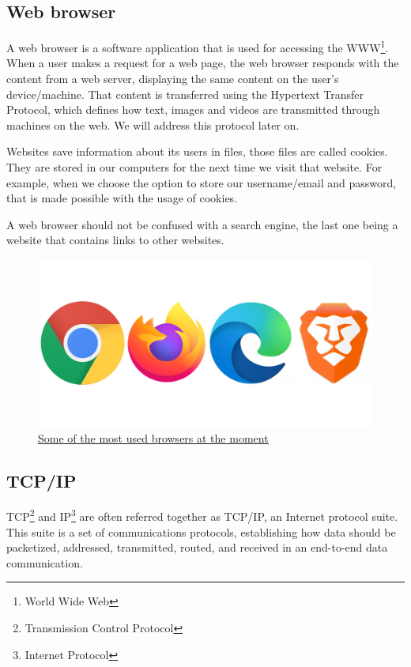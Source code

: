 \documentclass{article}
\newcommand\tab[1][1cm]{\hspace*{#1}}
\begin{document}
\subsection{Web browser}

\tab A web browser is a software application that is used for accessing the WWW\footnote{World Wide Web}. When a user makes a request for a web page, the web browser responds with the content from a web server, displaying the same content on the user's device/machine. That content is transferred using the Hypertext Transfer Protocol, which defines how text, images and videos are transmitted through machines on the web. We will address this protocol later on.

Websites save information about its users in files, those files are called cookies. They are stored in our computers for the next time we visit that website. For example, when we choose the option to store our username/email and password, that is made possible with the usage of cookies.

A web browser should not be confused with a search engine, the last one being a website that contains links to other websites.

\begin{figure}[H]
    \begin{center}
        \includegraphics[width=0.3 \textwidth]{images/browsers.png}
        \caption{\href{https://www.google.com/url?sa=i&url=https\%3A\%2F\%2Fventurebeat.com\%2F2020\%2F01\%2F15\%2Fbrowser-benchmark-battle-january-2020-chrome-firefox-edge-brave\%2F&psig=AOvVaw1kepSAmHxWnyx7E\_xnjq2a&ust=1617098633832000&source=images&cd=vfe&ved=0CAIQjRxqFwoTCJjgy\_-f1e8CFQAAAAAdAAAAABAD}{\underline{Some of the most used browsers at the moment}}}
    \end{center}
\end{figure}

\subsection{TCP/IP}

\tab TCP\footnote{Transmission Control Protocol} and IP\footnote{Internet Protocol} are often referred together as TCP/IP, an Internet protocol suite. This suite is a set of communications protocols, establishing how data should be packetized, addressed, transmitted, routed, and received in an end-to-end data communication.
\end{document}
